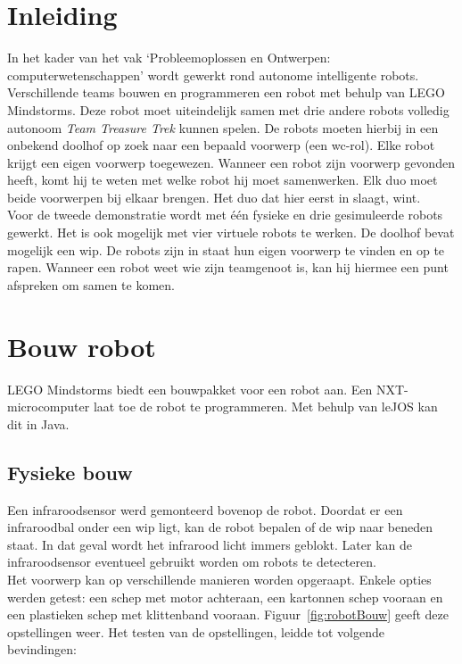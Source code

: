 \documentclass[tt2]{penoverslag}
\begin{document}
\newpage


\section{Inleiding} %
\label{ssec:Inl}
In het kader van het vak `Probleemoplossen en Ontwerpen: computerwetenschappen' wordt gewerkt rond autonome intelligente robots. Verschillende teams bouwen en programmeren een robot met behulp van LEGO Mindstorms. Deze robot moet uiteindelijk samen met drie andere robots volledig autonoom \textit{Team Treasure Trek} kunnen spelen.
De robots moeten hierbij in een onbekend doolhof op zoek naar een bepaald voorwerp (een wc-rol). Elke robot krijgt een eigen voorwerp toegewezen. Wanneer een robot zijn voorwerp gevonden heeft, komt hij te weten met welke robot hij moet samenwerken. Elk duo moet beide voorwerpen bij elkaar brengen. Het duo dat hier eerst in slaagt, wint.\\

Voor de tweede demonstratie wordt met \'e\'en fysieke en drie gesimuleerde robots gewerkt. Het is ook mogelijk met vier virtuele robots te werken. De doolhof bevat mogelijk een wip. De robots zijn in staat hun eigen voorwerp te vinden en op te rapen. Wanneer een robot weet wie zijn teamgenoot is, kan hij hiermee een punt afspreken om samen te komen.\\


\section{Bouw robot}
\label{ssec:Bouw}
LEGO Mindstorms biedt een bouwpakket voor een robot aan. Een NXT-microcomputer laat toe de robot te programmeren. Met behulp van leJOS kan dit in Java.

\subsection{Fysieke bouw}
\label{ssec:FysB}
Een infraroodsensor werd gemonteerd bovenop de robot. Doordat er een infraroodbal onder een wip ligt, kan de robot bepalen of de wip naar beneden staat. In dat geval wordt het infrarood licht immers geblokt. Later kan de infraroodsensor eventueel gebruikt worden om robots te detecteren.\\

Het voorwerp kan op verschillende manieren worden opgeraapt. Enkele opties werden getest: een schep met motor achteraan, een kartonnen schep vooraan en een plastieken schep met klittenband vooraan. Figuur~\ref{fig:robotBouw} geeft deze opstellingen weer. Het testen van de opstellingen, leidde tot volgende bevindingen:
\end{document}
